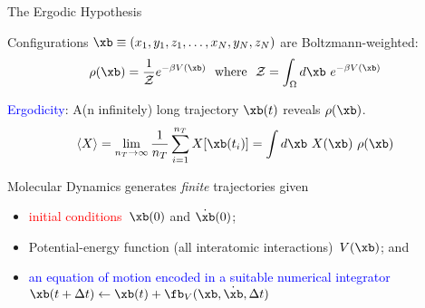 \begin{frame}[fragile]{The Ergodic Hypothesis}

Configurations $\xb \equiv (x_1, y_1, z_1, \dots, x_N, y_N, z_N)$ are \textcolor{red!80!black}{Boltzmann-weighted}:
\begin{displaymath}
\rho(\xb) = \frac{1}{\mathcal{Z}}e^{-\beta V(\xb)}\ \ \mbox{where}\ \ 
\mathcal{Z}  = \int_\Omega d\xb\ e^{-\beta V(\xb)}
\end{displaymath}

\textcolor{blue}{Ergodicity}:  A(n infinitely) long trajectory $\xb(t)$ \textcolor{green!80!black}{reveals} $\rho(\xb)$.
\begin{displaymath}
\langle X \rangle = \lim_{n_T\rightarrow\infty}\frac{1}{n_T}\sum_{i=1}^{n_T} 
X[\xb(t_i)] = \int d\xb\ X(\xb)\ \rho(\xb)
\end{displaymath}

\textcolor{green!80!black}{Molecular Dynamics} generates {\em finite} trajectories given
\begin{itemize}
\item \textcolor{red}{initial conditions}\ $\xb(0)$ and $\dot{\xb}(0)$;
\item \textcolor{green!80!black}{Potential-energy function (all interatomic interactions)}\ $V(\xb)$; and
\item \textcolor{blue}{an equation of motion encoded in a suitable numerical integrator}\\ $\xb(t+\Delta t) \gets \xb(t) + \fb_V(\xb,\dot{\xb},\Delta t)$
\end{itemize}
\end{frame}

